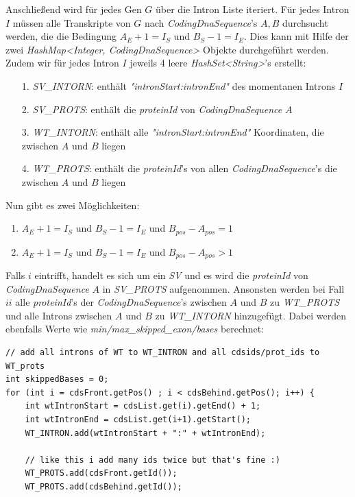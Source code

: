 \documentclass[12pt]{article}
\begin{document}
\begin{enumerate}
		Anschlie\ss end wird für jedes Gen $G$ über die Intron Liste iteriert. Für jedes Intron $I$
		müssen alle Transkripte von $G$ nach \textit{CodingDnaSequence}'s $A, B$ durchsucht werden, die
		die Bedingung $A_{E} + 1 = I_{S}$ und $B_{S} - 1 = I_{E}$. Dies kann mit Hilfe der zwei
		\textit{HashMap<Integer, CodingDnaSequence>} Objekte durchgeführt werden.
		Zudem wir für jedes Intron $I$ jeweils 4 leere \textit{HashSet<String>}'s erstellt:
		\begin{enumerate}
			\item[1.] \textit{SV\_INTORN}: enthält \textit{"intronStart:intronEnd"} des momentanen Introns $I$
			\item[2.] \textit{SV\_PROTS}: enthält die \textit{proteinId} von \textit{CodingDnaSequence} $A$
			\item[3.] \textit{WT\_INTORN}: enthält alle \textit{"intronStart:intronEnd"} Koordinaten, die zwischen $A$ und $B$ liegen
			\item[4.] \textit{WT\_PROTS}: enthält die \textit{proteinId}'s von allen \textit{CodingDnaSequence}'s die zwischen $A$ und $B$ liegen
		\end{enumerate}
		Nun gibt es zwei Möglichkeiten:
		\begin{enumerate}
			\item  $A_{E} + 1 = I_{S}$ und $B_{S} - 1 = I_{E}$ und $B_{pos} - A_{pos} = 1$
			\item  $A_{E} + 1 = I_{S}$ und $B_{S} - 1 = I_{E}$ und $B_{pos} - A_{pos} > 1$
		\end{enumerate}

		Falls $i$ eintrifft, handelt es sich um ein \textit{SV} und es wird die \textit{proteinId} von \textit{CodingDnaSequence} $A$
		in \textit{SV\_PROTS} aufgenommen.
		Ansonsten werden bei Fall $ii$ alle \textit{proteinId}'s der \textit{CodingDnaSequence}'s zwischen $A$ und $B$ zu
		\textit{WT\_PROTS} und alle Introns zwischen $A$ und $B$ zu \textit{WT\_INTORN} hinzugefügt.
		Dabei werden ebenfalls Werte wie \textit{min/max\_skipped\_exon/bases} berechnet:
		\begin{verbatim}
// add all introns of WT to WT_INTRON and all cdsids/prot_ids to WT_prots
int skippedBases = 0;
for (int i = cdsFront.getPos() ; i < cdsBehind.getPos(); i++) {
    int wtIntronStart = cdsList.get(i).getEnd() + 1;
    int wtIntronEnd = cdsList.get(i+1).getStart();
    WT_INTRON.add(wtIntronStart + ":" + wtIntronEnd);

    // like this i add many ids twice but that's fine :)
    WT_PROTS.add(cdsFront.getId());
    WT_PROTS.add(cdsBehind.getId());


\end{verbatim}
\end{enumerate}
\end{document}
